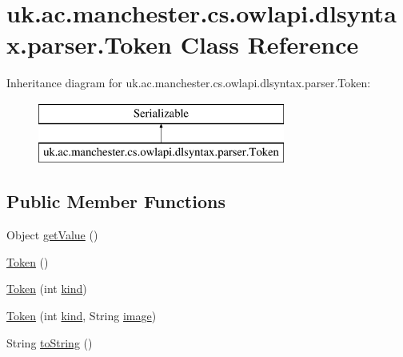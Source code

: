 \hypertarget{classuk_1_1ac_1_1manchester_1_1cs_1_1owlapi_1_1dlsyntax_1_1parser_1_1_token}{\section{uk.\-ac.\-manchester.\-cs.\-owlapi.\-dlsyntax.\-parser.\-Token Class Reference}
\label{classuk_1_1ac_1_1manchester_1_1cs_1_1owlapi_1_1dlsyntax_1_1parser_1_1_token}
}
Inheritance diagram for uk.\-ac.\-manchester.\-cs.\-owlapi.\-dlsyntax.\-parser.\-Token\-:\begin{figure}[H]
\begin{center}
\leavevmode
\includegraphics[height=2.000000cm]{classuk_1_1ac_1_1manchester_1_1cs_1_1owlapi_1_1dlsyntax_1_1parser_1_1_token}
\end{center}
\end{figure}
\subsection*{Public Member Functions}
\begin{DoxyCompactItemize}
\item 
Object \hyperlink{classuk_1_1ac_1_1manchester_1_1cs_1_1owlapi_1_1dlsyntax_1_1parser_1_1_token_a7d8225fe85d96cbb8ba7970968b3db89}{get\-Value} ()
\item 
\hyperlink{classuk_1_1ac_1_1manchester_1_1cs_1_1owlapi_1_1dlsyntax_1_1parser_1_1_token_ab855dd640b15ac62833dd01dc984444d}{Token} ()
\item 
\hyperlink{classuk_1_1ac_1_1manchester_1_1cs_1_1owlapi_1_1dlsyntax_1_1parser_1_1_token_a3c3beacac32a7f0e3c48ce83673c8fdb}{Token} (int \hyperlink{classuk_1_1ac_1_1manchester_1_1cs_1_1owlapi_1_1dlsyntax_1_1parser_1_1_token_acca2ffb5b7d9c23e5c81883c10856b43}{kind})
\item 
\hyperlink{classuk_1_1ac_1_1manchester_1_1cs_1_1owlapi_1_1dlsyntax_1_1parser_1_1_token_a353984c35ff486ace8bf19c44602ec76}{Token} (int \hyperlink{classuk_1_1ac_1_1manchester_1_1cs_1_1owlapi_1_1dlsyntax_1_1parser_1_1_token_acca2ffb5b7d9c23e5c81883c10856b43}{kind}, String \hyperlink{classuk_1_1ac_1_1manchester_1_1cs_1_1owlapi_1_1dlsyntax_1_1parser_1_1_token_a164b422e7ed8f52d725f36829e7691de}{image})
\item 
String \hyperlink{classuk_1_1ac_1_1manchester_1_1cs_1_1owlapi_1_1dlsyntax_1_1parser_1_1_token_ac4fce74e44f40dcc154b5bf307ae1a2f}{to\-String} ()
\end{DoxyCompactItemize}
